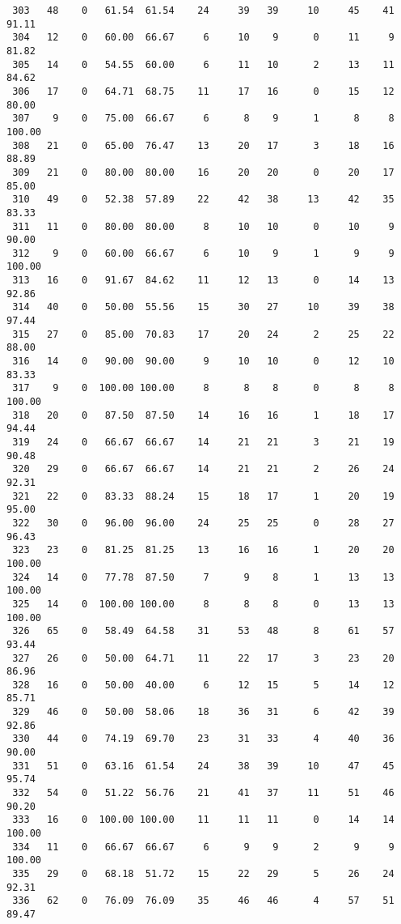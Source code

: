 \begin{verbatim}
 303   48    0   61.54  61.54    24     39   39     10     45    41    91.11
 304   12    0   60.00  66.67     6     10    9      0     11     9    81.82
 305   14    0   54.55  60.00     6     11   10      2     13    11    84.62
 306   17    0   64.71  68.75    11     17   16      0     15    12    80.00
 307    9    0   75.00  66.67     6      8    9      1      8     8   100.00
 308   21    0   65.00  76.47    13     20   17      3     18    16    88.89
 309   21    0   80.00  80.00    16     20   20      0     20    17    85.00
 310   49    0   52.38  57.89    22     42   38     13     42    35    83.33
 311   11    0   80.00  80.00     8     10   10      0     10     9    90.00
 312    9    0   60.00  66.67     6     10    9      1      9     9   100.00
 313   16    0   91.67  84.62    11     12   13      0     14    13    92.86
 314   40    0   50.00  55.56    15     30   27     10     39    38    97.44
 315   27    0   85.00  70.83    17     20   24      2     25    22    88.00
 316   14    0   90.00  90.00     9     10   10      0     12    10    83.33
 317    9    0  100.00 100.00     8      8    8      0      8     8   100.00
 318   20    0   87.50  87.50    14     16   16      1     18    17    94.44
 319   24    0   66.67  66.67    14     21   21      3     21    19    90.48
 320   29    0   66.67  66.67    14     21   21      2     26    24    92.31
 321   22    0   83.33  88.24    15     18   17      1     20    19    95.00
 322   30    0   96.00  96.00    24     25   25      0     28    27    96.43
 323   23    0   81.25  81.25    13     16   16      1     20    20   100.00
 324   14    0   77.78  87.50     7      9    8      1     13    13   100.00
 325   14    0  100.00 100.00     8      8    8      0     13    13   100.00
 326   65    0   58.49  64.58    31     53   48      8     61    57    93.44
 327   26    0   50.00  64.71    11     22   17      3     23    20    86.96
 328   16    0   50.00  40.00     6     12   15      5     14    12    85.71
 329   46    0   50.00  58.06    18     36   31      6     42    39    92.86
 330   44    0   74.19  69.70    23     31   33      4     40    36    90.00
 331   51    0   63.16  61.54    24     38   39     10     47    45    95.74
 332   54    0   51.22  56.76    21     41   37     11     51    46    90.20
 333   16    0  100.00 100.00    11     11   11      0     14    14   100.00
 334   11    0   66.67  66.67     6      9    9      2      9     9   100.00
 335   29    0   68.18  51.72    15     22   29      5     26    24    92.31
 336   62    0   76.09  76.09    35     46   46      4     57    51    89.47

\end{verbatim}
